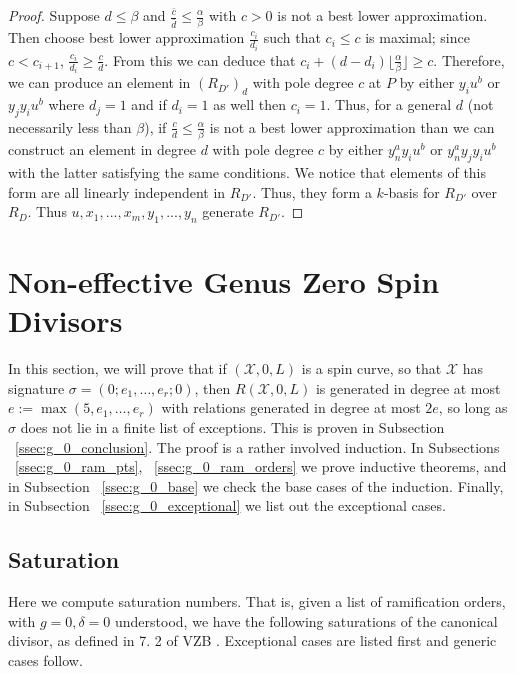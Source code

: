 \documentclass{amsart}
\theoremstyle{plain}
\theoremstyle{definition}
\theoremstyle{remark}
\numberwithin{equation}{section}
\newcommand\ssec{\subsection}
\newcommand \sx{\mathscr X}
\begin{document}
\begin{proof}
Suppose $d\le \beta$ and $\frac{\bar{c}}{\bar{d}}\le \frac{\alpha}{
\beta}$ with $c>0$ is not a best lower approximation.  Then choose
best lower approximation $\frac{c_i}{d_i}$ such that $c_i\le c$ is
maximal; since $c<c_{i+1}$, $\frac{c_i}{d_i}\ge \frac{c}{d}$.  From
this we can deduce that $c_i+(d-d_i)\lfloor \frac{\alpha}{\beta}
\rfloor\ge c$.  Therefore, we can produce an element in $(R_{D'})_d$
 with pole degree $c$ at $P$ by either $y_i u^b$ or $y_j y_i u^b$
where $d_j=1$ and if $d_i=1$ as well then $c_i=1$. Thus, for a
general $d$ (not necessarily less than $\beta$), if $\frac{c}{d} \le
\frac{\alpha}{\beta}$ is not a best lower approximation than we can
construct an element in degree $d$ with pole degree $c$ by either $y
_n^a y_i u^b$ or $y_n^a y_j y_iu^b$ with the latter satisfying the
same conditions.  We notice that elements of this form are all
linearly independent in $R_{D'}$.  Thus, they form a $k$-basis for
$R_{D'}$ over $R_D$.  Thus $u,x_1,...,x_m,y_1,...,y_n$ generate
$R_{D'}$.






\end{proof}



\section{Non-effective Genus Zero Spin Divisors}
\label{sec:g_0_non_effective}

In this section, we will prove that if $(\sx , 0, L)$ is a spin curve,
so that $\sx$ has signature $\sigma = (0; e_1, \ldots , e_r; 0)$, then
$R(\sx , 0, L)$ is generated in degree at most $e := \max(5, e_1, \ldots,
e_r)$ with relations generated in degree at most $2e$, so long as $\sigma$
does not lie in a finite list of exceptions. This is proven in
Subsection ~\ref{ssec:g_0_conclusion}. The proof is a rather
involved induction. In Subsections ~\ref{ssec:g_0_ram_pts},
~\ref{ssec:g_0_ram_orders} we prove inductive theorems, and in
Subsection ~\ref{ssec:g_0_base} we check the base cases of the
induction. Finally, in Subsection ~\ref{ssec:g_0_exceptional} we
list out the exceptional cases.

\ssec{Saturation}
\label{ssec:g_0_saturation}
Here we compute saturation numbers. That is, given a list of
ramification orders, with $g = 0,\delta = 0$ understood, we have
the following saturations of the canonical divisor, as defined in 7.
2 of VZB \cite{vzb:stacky}. Exceptional cases are listed first
and generic cases follow.
\end{document}
